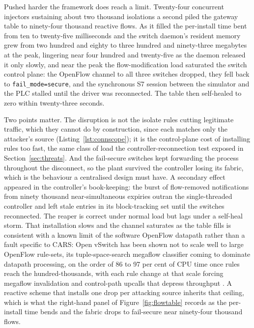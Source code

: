 Pushed harder the framework does reach a limit. Twenty-four concurrent injectors sustaining about two thousand isolations a second piled the gateway table to ninety-four thousand reactive flows. As it filled the per-install time bent from ten to twenty-five milliseconds and the switch daemon's resident memory grew from two hundred and eighty to three hundred and ninety-three megabytes at the peak, lingering near four hundred and twenty-five as the daemon released it only slowly, and near the peak the flow-modification load saturated the switch control plane: the OpenFlow channel to all three switches dropped, they fell back to \texttt{fail\_mode=secure}, and the synchronous S7 session between the simulator and the PLC stalled until the driver was reconnected. The table then self-healed to zero within twenty-three seconds.

Two points matter. The disruption is not the isolate rules cutting legitimate traffic, which they cannot do by construction, since each matches only the attacker's source (Listing~\ref{lst:connscope}); it is the control-plane cost of installing rules too fast, the same class of load the controller-reconnection test exposed in Section~\ref{sec:threats}. And the fail-secure switches kept forwarding the process throughout the disconnect, so the plant survived the controller losing its fabric, which is the behaviour a centralised design must have. A secondary effect appeared in the controller's book-keeping: the burst of flow-removed notifications from ninety thousand near-simultaneous expiries outran the single-threaded controller and left stale entries in its block-tracking set until the switches reconnected. The reaper is correct under normal load but lags under a self-heal storm. That installation slows and the channel saturates as the table fills is consistent with a known limit of the software OpenFlow datapath rather than a fault specific to CARS: Open vSwitch has been shown not to scale well to large OpenFlow rule-sets, its tuple-space-search megaflow classifier \cite{pfaff2015design} coming to dominate datapath processing, on the order of 86 to 97 per cent of CPU time once rules reach the hundred-thousands, with each rule change at that scale forcing megaflow invalidation and control-path upcalls that depress throughput \cite{rashelbach2022scaling}. A reactive scheme that installs one drop per attacking source inherits that ceiling, which is what the right-hand panel of Figure~\ref{fig:flowtable} records as the per-install time bends and the fabric drops to fail-secure near ninety-four thousand flows.

